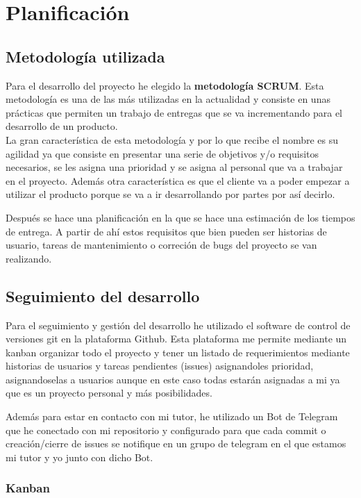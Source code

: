 \chapter{Planificación}

\section{Metodología utilizada}
Para el desarrollo del proyecto he elegido la \textbf{metodología SCRUM}.
Esta metodología es una de las más utilizadas en la actualidad y consiste en unas prácticas que permiten un trabajo de entregas que se va incrementando para el desarrollo de un producto. \\
La gran característica de esta metodología y por lo que recibe el nombre es su agilidad ya que consiste en presentar una serie de objetivos y/o requisitos necesarios, se les asigna una prioridad y se asigna al personal que va a trabajar en el proyecto.
Además otra característica es que el cliente va a poder empezar a utilizar el producto porque se va a ir desarrollando por partes por así decirlo.

Después se hace una planificación en la que se hace una estimación de los tiempos de entrega.
A partir de ahí estos requisitos que bien pueden ser historias de usuario, tareas de mantenimiento o correción de bugs del proyecto se van realizando.
 
\section{Seguimiento del desarrollo}

Para el seguimiento y gestión del desarrollo he utilizado el software de control de versiones
git en la plataforma Github. Esta plataforma me permite mediante un kanban organizar todo el proyecto
y tener un listado de requerimientos mediante historias de usuarios y tareas pendientes (issues) asignandoles
prioridad, asignandoselas a usuarios aunque en este caso todas estarán asignadas a mi ya que es un proyecto personal 
y más posibilidades.

Además para estar en contacto con mi tutor, he utilizado un Bot de Telegram que he conectado con mi repositorio y 
configurado para que cada commit o creación/cierre de issues se notifique en un grupo de telegram en el que estamos mi tutor y yo
junto con dicho Bot.

\subsection{Kanban}

